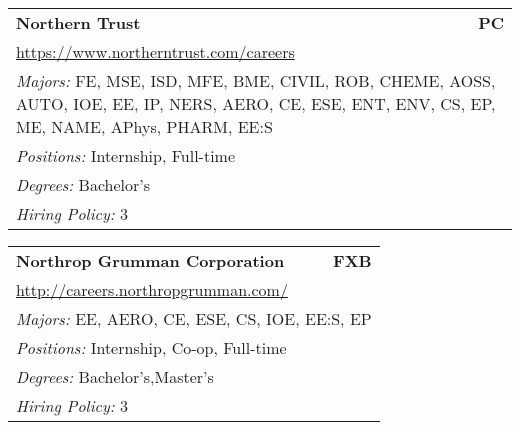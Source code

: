 \documentclass[twoside]{article}
\begin{document}
\begin{center}
\begin{multicols}{3}
\begin{FlushLeft}
\begin{minipage}{\columnwidth}
\end{minipage}
 
\begin{minipage}{\columnwidth}\begin{tabularx}{.95\columnwidth}{Xr}
                 {\Large\bf Northern Trust} & {\Large\bf PC}\\
    \multicolumn{2}{p{.95\columnwidth}}{\url{https://www.northerntrust.com/careers}}\\
    \multicolumn{2}{p{.95\columnwidth}}{\emph{Majors:} FE, MSE, ISD, MFE, BME, CIVIL, ROB, CHEME, AOSS, AUTO, IOE, EE, IP, NERS, AERO, CE, ESE, ENT, ENV, CS, EP, ME, NAME, APhys, PHARM, EE:S}\\
    \multicolumn{2}{p{.95\columnwidth}}{\emph{Positions:} Internship, Full-time}\\
    \multicolumn{2}{p{.95\columnwidth}}{\emph{Degrees:} Bachelor's}\\
    \multicolumn{2}{p{.95\columnwidth}}{\emph{Hiring Policy:} 3}\\
    \end{tabularx}
    
\end{minipage}
 
\begin{minipage}{\columnwidth}\begin{tabularx}{.95\columnwidth}{Xr}
                 {\Large\bf Northrop Grumman Corporation} & {\Large\bf FXB}\\
    \multicolumn{2}{p{.95\columnwidth}}{\url{http://careers.northropgrumman.com/}}\\
    \multicolumn{2}{p{.95\columnwidth}}{\emph{Majors:} EE, AERO, CE, ESE, CS, IOE, EE:S, EP}\\
    \multicolumn{2}{p{.95\columnwidth}}{\emph{Positions:} Internship, Co-op, Full-time}\\
    \multicolumn{2}{p{.95\columnwidth}}{\emph{Degrees:} Bachelor's,Master's}\\
    \multicolumn{2}{p{.95\columnwidth}}{\emph{Hiring Policy:} 3}\\
    \end{tabularx}
    
\end{minipage}
 

\end{FlushLeft}
\end{multicols}
\end{center}
\end{document}

